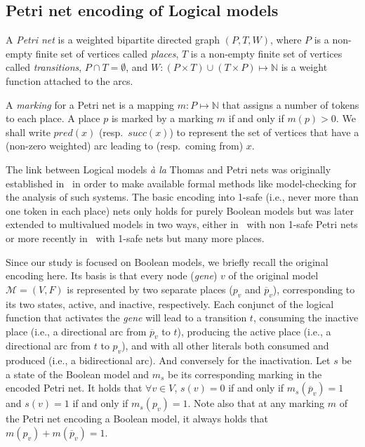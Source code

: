 \documentclass[runningheads]{llncs}
\begin{document}
\subsection{Petri net encoding of Logical models}%
\label{sec:encoding}

\begin{definition}

  A \emph{Petri net} is a weighted bipartite directed graph \((P, T, W)\),
  where \(P\) is a non-empty finite set of vertices called \emph{places},
  \(T\) is a non-empty finite set of vertices called \emph{transitions},
  \(P \cap T = \emptyset\),
  and \(W : (P \times T) \cup (T \times P) \mapsto \mathbb{N} \) is a weight function attached to the arcs.

\end{definition}
A \emph{marking} for a Petri net is a mapping \(m : P \mapsto \mathbb{N}\) that assigns a number of tokens to each place. A place \(p\) is marked by a marking \(m\) if and only if \(m(p) > 0\). We shall write \(pred(x)\) (resp.\ \(succ(x)\)) to represent the set of vertices that have a (non-zero weighted) arc leading to (resp.\ coming from) \(x\).

The link between Logical models \emph{à la} Thomas and Petri nets was originally established in~\cite{chaouiya2004qualitative} in order to make available formal methods like model-checking for the analysis of such systems.
The basic encoding into 1-safe (i.e., never more than one token in each place) nets only holds for purely Boolean models but was later extended to multivalued models in two ways, either in~\cite{chaouiya2011petri} with non 1-safe Petri nets or more recently in~\cite{chatain2014characterization} with 1-safe nets but many more places.

Since our study is focused on Boolean models, we briefly recall the original encoding here.
Its basis is that every node (\emph{gene}) \(v\) of the original model \(\mathcal{M} = (V, F)\) is represented by two separate places (\(p_v\) and \(\overline{p}_v\)), corresponding to its two states, active, and inactive, respectively.
Each conjunct of the logical function that activates the \emph{gene} will lead to a transition \(t\), consuming the inactive place (i.e., a directional arc from \(\overline{p}_v\) to \(t\)), producing the active place (i.e., a directional arc from \(t\) to \(p_v\)), and with all other literals both consumed and produced (i.e., a bidirectional arc).
And conversely for the inactivation. 
Let \(s\) be a state of the Boolean model and \(m_s\) be its corresponding marking in the encoded Petri net. It holds that \(\forall v \in V\), \(s(v) = 0\) if and only if \(m_s(\overline{p}_v) = 1\) and \(s(v) = 1\) if and only if \(m_s(p_v) = 1\). Note also that at any marking \(m\) of the Petri net encoding a Boolean model, it always holds that \(m(p_v) + m(\overline{p}_v) = 1\).
\end{document}
